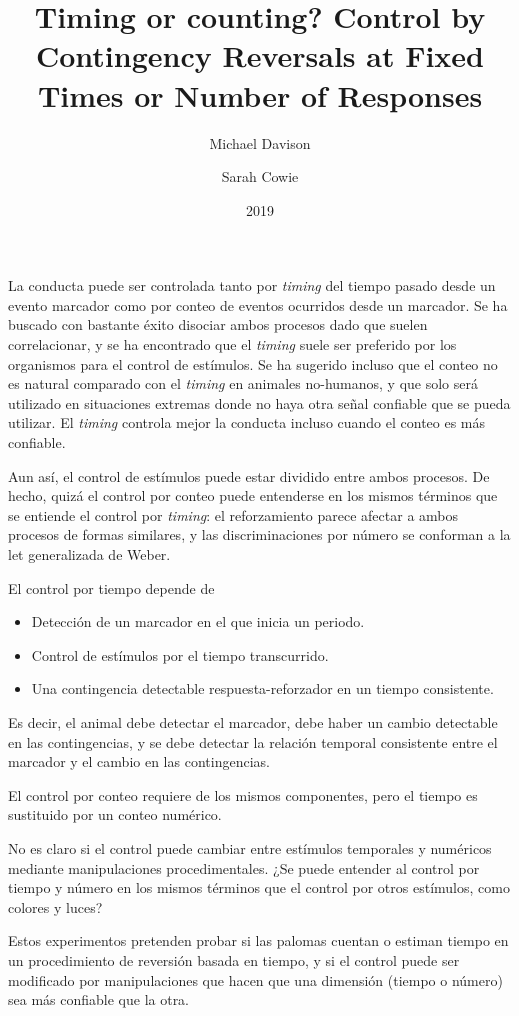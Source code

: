 \documentclass[a4paper,12pt]{article}
\title{Timing or counting? Control by Contingency Reversals at Fixed Times or Number of Responses}
\author{Michael Davison \and Sarah Cowie}
\date{2019}
\begin{document}
{\scshape\bfseries \maketitle}

La conducta puede ser controlada tanto por {\itshape timing} del tiempo pasado desde un evento marcador como por conteo de eventos ocurridos desde un marcador. Se ha buscado con bastante éxito disociar ambos procesos dado que suelen correlacionar, y se ha encontrado que el {\itshape timing} suele ser preferido por los organismos para el control de estímulos. Se ha sugerido incluso que el conteo no es natural comparado con el {\itshape timing} en animales no-humanos, y que solo será utilizado en situaciones extremas donde no haya otra señal confiable que se pueda utilizar. El {\itshape timing} controla mejor la conducta incluso cuando el conteo es más confiable.

Aun así, el control de estímulos puede estar dividido entre ambos procesos. De hecho, quizá el control por conteo puede entenderse en los mismos términos que se entiende el control por {\itshape timing}: el reforzamiento parece  afectar a ambos procesos de formas similares, y las discriminaciones por número se conforman a la let generalizada de Weber.

El control por tiempo depende de
\begin{itemize}
    \item Detección de un marcador en el que inicia un periodo.
    \item Control de estímulos por el tiempo transcurrido.
    \item Una contingencia detectable respuesta-reforzador en un tiempo consistente.
\end{itemize}

Es decir, el animal debe detectar el marcador, debe haber un cambio detectable en las contingencias, y se debe detectar la relación temporal consistente entre el marcador y el cambio en las contingencias.

El control por conteo requiere de los mismos componentes, pero el tiempo es sustituido por un conteo numérico.

No es claro si el control puede cambiar entre estímulos temporales y numéricos mediante manipulaciones procedimentales. ¿Se puede entender al control por tiempo y número en los mismos términos que el control por otros estímulos, como colores y luces?

Estos experimentos pretenden probar si las palomas cuentan o estiman tiempo en un procedimiento de reversión basada en tiempo, y si el control puede ser modificado por manipulaciones que hacen que una dimensión (tiempo o número) sea más confiable que la otra.
\end{document}

